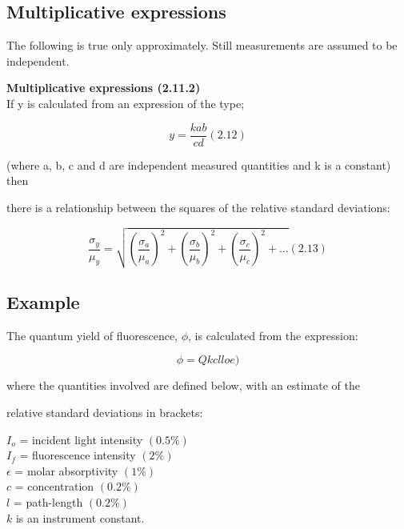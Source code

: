  

\subsection{Multiplicative expressions}

The following is true only approximately. Still measurements are assumed to be independent.

 

\noindent \textbf{Multiplicative expressions (2.11.2)}\\

If y is calculated from an expression of the type;

\[ y = \frac{kab}{cd} (2.12)\]

 

(where a, b, c and d are independent measured quantities and k is a constant) then

there is a relationship between the squares of the relative standard deviations:

 

\[ \frac{\sigma_y}{\mu_y} = \sqrt{(\frac{\sigma_a}{\mu_a})^2 + (\frac{\sigma_b}{\mu_b})^2 + (\frac{\sigma_c}{\mu_c})^2 + \ldots} (2.13)\]

 

\subsection{Example}

 

The quantum yield of fluorescence, $\phi$, is calculated from the expression:

\[\phi = Qkclloe)\]

where the quantities involved are defined below, with an estimate of the

relative standard deviations in brackets:

 

$I_o$ = incident light intensity $(0.5\%)$\\

$I_f$ = fluorescence intensity $(2\%)$\\

$\epsilon$ = molar absorptivity $(1\%)$\\

$c$ = concentration $(0.2\%)$\\

$l$ = path-length $(0.2\%)$\\

$k$ is an instrument constant.\\

